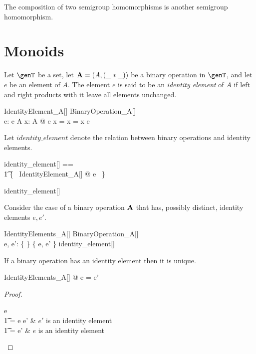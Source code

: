 \documentclass{amsart}
\begin{document}
\begin{remark}
The composition of two semigroup homomorphisms is another semigroup homomorphism.
\end{remark}

\section{Monoids}

Let $\genT$ be a set, let $\mathbf{A} = (A, (\_ \mathbin{*} \_))$ be a binary operation in $\genT$, and let $e$ be an element of $A$.
The element $e$ is said to be an \textit{identity element} of $A$ if left and right 
products with it leave all elements unchanged.
\begin{schema}{IdentityElement\_A}[\genT]
	BinaryOperation\_A[\genT] \\
	e: \genT
\where
	e \in A
\also
	\forall x: A @ e \mulA x = x = x \mulA e
\end{schema}

Let $identity\_element$ denote the relation between binary operations and identity elements.
\begin{zed}
	identity\_element[\genT] == \\
	\t1	\{~ IdentityElement\_A[\genT] @ \strucA \mapsto e ~\}
\end{zed}

\begin{remark}
\begin{zed}
	identity\_element[\setT] \in \binop \setT \rel \setT
\end{zed}
\end{remark}

Consider the case of a binary operation $\mathbf{A}$ that has, possibly distinct, identity elements $e, e'$.
\begin{schema}{IdentityElements\_A}[\genT]
	BinaryOperation\_A[\genT] \\
	e, e': \genT
\where
	\{ \strucA \} \cross \{ e, e' \} \subseteq identity\_element[\genT]
\end{schema}

\begin{remark}
If a binary operation has an identity element then it is unique.

\begin{zed}
	\forall IdentityElements\_A[\setT] @ e = e'
\end{zed}

\begin{proof}
\begin{argue}
e \\
\t1	= e \mulA e'	& $e'$ is an identity element \\
\t1	= e'			& $e$ is an identity element
\end{argue}
\end{proof}

\end{remark}
\end{document}
